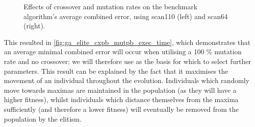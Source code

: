 \documentclass[authoryearcitations]{UoYCSproject}
\begin{document}
\begin{figure}
\begin{subfigure}[b]{0.5\textwidth}
\end{subfigure}
\begin{subfigure}[b]{0.5\textwidth}
\end{subfigure}
	\caption{Effects of crossover and mutation rates on the benchmark algorithm's average combined error, using scan110 (left) and scan64 (right).}
	\label{fig:ga_elite_cxpb_mutpb_exec_time}
\end{figure}

This resulted in \autoref{fig:ga_elite_cxpb_mutpb_exec_time}, which demonstrates that an average minimal combined error will occur when utilising a 100 \% mutation rate and no crossover; we will therefore use as the basis for which to select further parameters. This result can be explained by the fact that it maximises the movement of an individual throughout the evolution. Individuals which randomly move towards maximas are maintained in the population (as they will have a higher fitness), whilst individuals which distance themselves from the maxima sufficiently (and therefore a lower fitness) will eventually be removed from the population by the elitism.
\end{document}
